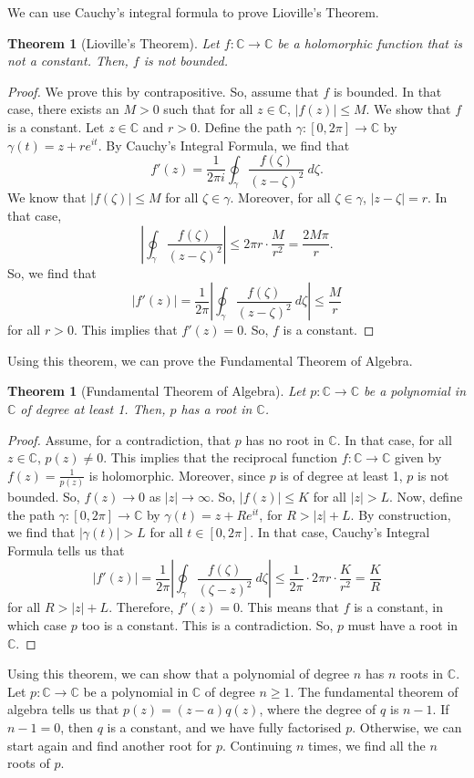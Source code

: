 \documentclass[a4paper, openany]{memoir}
\theoremstyle{definition}
\theoremstyle{plain}
\newtheorem{theorem}[definition]{Theorem}
\begin{document}
We can use Cauchy's integral formula to prove Lioville's Theorem.
\begin{theorem}[Lioville's Theorem]
Let $f: \mathbb{C} \to \mathbb{C}$ be a holomorphic function that is not a constant. Then, $f$ is not bounded.
\end{theorem}
\begin{proof}
We prove this by contrapositive. So, assume that $f$ is bounded. In that case, there exists an $M > 0$ such that for all $z \in \mathbb{C}$, $|f(z)| \leq M$. We show that $f$ is a constant. Let $z \in \mathbb{C}$ and $r > 0$. Define the path $\gamma: [0, 2\pi] \to \mathbb{C}$ by $\gamma(t) = z + re^{it}$. By Cauchy's Integral Formula, we find that
\[f'(z) = \frac{1}{2\pi i} \oint_\gamma \frac{f(\zeta)}{(z - \zeta)^2} \ d\zeta.\]
We know that $|f(\zeta)| \leq M$ for all $\zeta \in \gamma$. Moreover, for all $\zeta \in \gamma$, $|z - \zeta| = r$. In that case,
\[\left|\oint_\gamma \frac{f(\zeta)}{(z - \zeta)^2}\right| \leq 2\pi r \cdot \frac{M}{r^2} = \frac{2M \pi}{r}.\]
So, we find that
\[|f'(z)| = \frac{1}{2\pi} \left|\oint_\gamma \frac{f(\zeta)}{(z - \zeta)^2} \ d\zeta\right| \leq \frac{M}{r}\]
for all $r > 0$. This implies that $f'(z) = 0$. So, $f$ is a constant.
\end{proof}
\noindent Using this theorem, we can prove the Fundamental Theorem of Algebra.
\begin{theorem}[Fundamental Theorem of Algebra]
Let $p: \mathbb{C} \to \mathbb{C}$ be a polynomial in $\mathbb{C}$ of degree at least 1. Then, $p$ has a root in $\mathbb{C}$.
\end{theorem}
\begin{proof}
Assume, for a contradiction, that $p$ has no root in $\mathbb{C}$. In that case, for all $z \in \mathbb{C}$, $p(z) \neq 0$. This implies that the reciprocal function $f: \mathbb{C} \to \mathbb{C}$ given by $f(z) = \frac{1}{p(z)}$ is holomorphic. Moreover, since $p$ is of degree at least 1, $p$ is not bounded. So, $f(z) \to 0$ as $|z| \to \infty$. So, $|f(z)| \leq K$ for all $|z| > L$. Now, define the path $\gamma:[0, 2\pi] \to \mathbb{C}$ by $\gamma(t) = z + Re^{it}$, for $R > |z| + L$. By construction, we find that $|\gamma(t)| > L$ for all $t \in [0, 2\pi]$. In that case, Cauchy's Integral Formula tells us that
\[|f'(z)| = \frac{1}{2\pi} \left|\oint_\gamma \frac{f(\zeta)}{(\zeta - z)^2} \ d\zeta\right| \leq \frac{1}{2\pi} \cdot 2\pi r \cdot \frac{K}{r^2} = \frac{K}{R}\]
for all $R > |z| + L$. Therefore, $f'(z) = 0$. This means that $f$ is a constant, in which case $p$ too is a constant. This is a contradiction. So, $p$ must have a root in $\mathbb{C}$.
\end{proof}
\noindent Using this theorem, we can show that a polynomial of degree $n$ has $n$ roots in $\mathbb{C}$. Let $p: \mathbb{C} \to \mathbb{C}$ be a polynomial in $\mathbb{C}$ of degree $n \geq 1$. The fundamental theorem of algebra tells us that $p(z) = (z - a)q(z)$, where the degree of $q$ is $n - 1$. If $n - 1 = 0$, then $q$ is a constant, and we have fully factorised $p$. Otherwise, we can start again and find another root for $p$. Continuing $n$ times, we find all the $n$ roots of $p$.
\newpage
\end{document}
